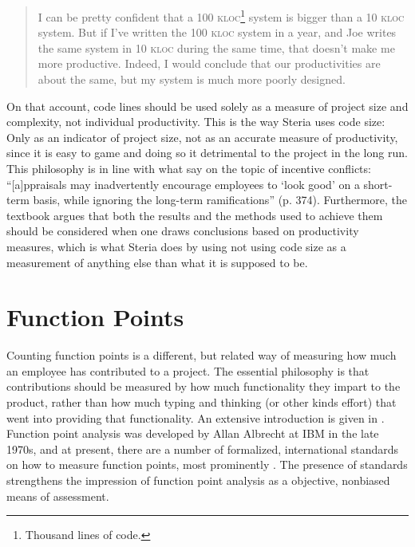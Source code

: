\documentclass[letterpaper, 12pt]{report}
\begin{document}
\begin{quote}
I can be pretty confident that a 100 \textsc{kloc}\footnote{Thousand lines of code.} system is bigger than a 10 \textsc{kloc} system. But if I've written the 100 \textsc{kloc} system in a year, and Joe writes the same system in 10 \textsc{kloc} during the same time, that doesn't make me more productive. Indeed, I would conclude that our productivities are about the same, but my system is much more poorly designed.
\end{quote}

On that account, code lines should be used solely as a measure of project size and complexity, not individual productivity. 
This is the way Steria uses code size: 
Only as an indicator of project size, not as an accurate measure of productivity, since it is easy to game and doing so it detrimental to the project in the long run.
This philosophy is in line with what \textcite{textbook} say on the topic of incentive conflicts:
``[a]ppraisals may inadvertently encourage employees to `look good' on a short-term basis, while ignoring the long-term ramifications'' (p. 374).
Furthermore, the textbook argues that both the results and the methods used to achieve them should be considered when one draws conclusions based on productivity measures, which is what Steria does by using not using code size as a measurement of anything else than what it is supposed to be.





\section{Function Points}
Counting function points is a different, but related way of measuring how much an employee has contributed to a project. 
The essential philosophy is that contributions should be measured by how much functionality they impart to the product, rather than how much typing and thinking (or other kinds effort) that went into providing that functionality. An extensive introduction is given in \textcite{symons:functionpoints}.
Function point analysis was developed by Allan Albrecht at IBM in the late 1970s, and at present, there are a number of formalized, international standards on how to measure function points, most prominently \parencite{iso:functionpoints}. 
The presence of standards strengthens the impression of function point analysis as a objective, nonbiased means of assessment.
\end{document}
